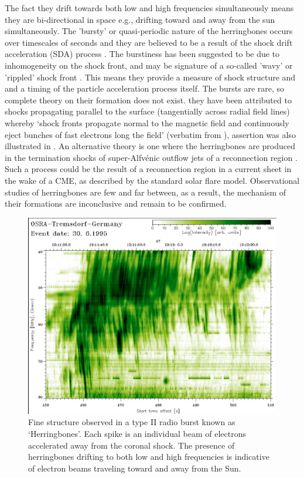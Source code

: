 The fact they drift towards both low and high frequencies simultaneously means they are bi-directional in space e.g., drifting toward and away from the sun simultaneously. The 'bursty' or quasi-periodic nature of the herringbones occurs over timescales of seconds \citep{mann1995, mann2005} and they are believed to be a result of the shock drift acceleration (SDA) process \citep{miteva2007}. The burstiness has been suggested to be due to inhomogeneity on the shock front, and may be signature of a so-called 'wavy' or 'rippled' shock front \citep{zlobec1993, guo2010, vandas2011}. This means they provide a measure of shock structure and and a timing of the particle acceleration process itself. The bursts are rare, so complete theory on their formation does not exist. they have been attributed to shocks propagating parallel to the surface (tangentially across radial field lines) whereby \textquoteleft shock fronts propagate normal to the magnetic field and continuously eject bunches of fast electrons long the field' (verbatim from \citet{wild1964}), assertion was also illustrated in \citet{stewart1980}. An alternative theory is one where the herringbones are produced in the termination shocks of super-Alfv\'{e}nic outflow jets of a reconnection region \citep{aurass2002, aurass2004}. Such a process could be the result of a reconnection region in a current sheet in the wake of a CME, as described by the standard solar flare model. Observational studies of herringbones are few and far between, as a result, the mechanism of their formations are inconclusive and remain to be confirmed.
\begin{figure}[!t]
\begin{center}
\includegraphics[scale=1.4]{images/miteva_herbones.pdf}
\caption[Herringbone radio bursts]{Fine structure observed in a type II radio burst known as \textquoteleft Herringbones'. Each spike is an individual beam of electrons accelerated away from the coronal shock. The presence of herringbones drifting to both low and high frequencies is indicative of electron beams traveling toward and away from the Sun.}
\label{fig:herringbones}
\end{center}
\end{figure}

